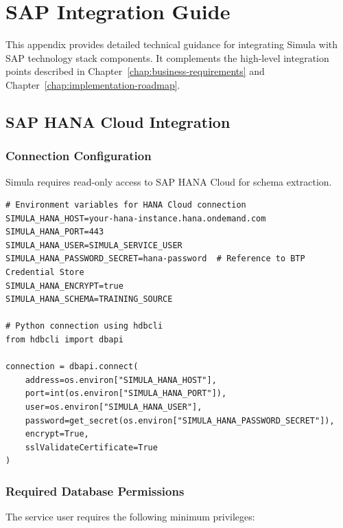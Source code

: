\chapter{SAP Integration Guide}
\label{chap:sap-integration-guide}

This appendix provides detailed technical guidance for integrating Simula with
SAP technology stack components. It complements the high-level integration
points described in Chapter~\ref{chap:business-requirements} and
Chapter~\ref{chap:implementation-roadmap}.

\section{SAP HANA Cloud Integration}

\subsection{Connection Configuration}

Simula requires read-only access to SAP HANA Cloud for schema extraction.

\begin{lstlisting}[language=jsonx,caption={HANA Cloud connection configuration}]
# Environment variables for HANA Cloud connection
SIMULA_HANA_HOST=your-hana-instance.hana.ondemand.com
SIMULA_HANA_PORT=443
SIMULA_HANA_USER=SIMULA_SERVICE_USER
SIMULA_HANA_PASSWORD_SECRET=hana-password  # Reference to BTP Credential Store
SIMULA_HANA_ENCRYPT=true
SIMULA_HANA_SCHEMA=TRAINING_SOURCE

# Python connection using hdbcli
from hdbcli import dbapi

connection = dbapi.connect(
    address=os.environ["SIMULA_HANA_HOST"],
    port=int(os.environ["SIMULA_HANA_PORT"]),
    user=os.environ["SIMULA_HANA_USER"],
    password=get_secret(os.environ["SIMULA_HANA_PASSWORD_SECRET"]),
    encrypt=True,
    sslValidateCertificate=True
)
\end{lstlisting}

\subsection{Required Database Permissions}

The service user requires the following minimum privileges:


